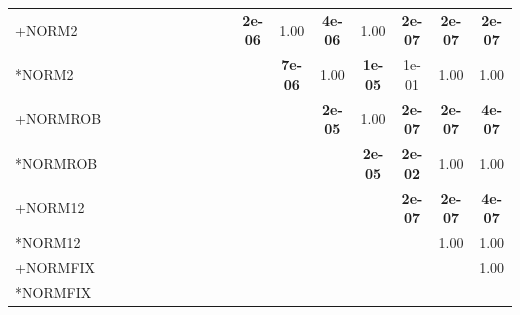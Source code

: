\begin{table}[t]
{\begin{tabular}{lcccccccccccccccc}
+NORM2 &  &  &  &  &  &  &  &  &  & \textbf{2e-06} & 1.00 & \textbf{4e-06} & 1.00 & \textbf{2e-07} & \textbf{2e-07} & \textbf{2e-07} \\
*NORM2 &  &  &  &  &  &  &  &  &  &  & \textbf{7e-06} & 1.00 & \textbf{1e-05} & 1e-01 & 1.00 & 1.00 \\
+NORMROB &  &  &  &  &  &  &  &  &  &  &  & \textbf{2e-05} & 1.00 & \textbf{2e-07} & \textbf{2e-07} & \textbf{4e-07} \\
*NORMROB &  &  &  &  &  &  &  &  &  &  &  &  & \textbf{2e-05} & \textbf{2e-02} & 1.00 & 1.00 \\
+NORM12 &  &  &  &  &  &  &  &  &  &  &  &  &  & \textbf{2e-07} & \textbf{2e-07} & \textbf{4e-07} \\
*NORM12 &  &  &  &  &  &  &  &  &  &  &  &  &  &  & 1.00 & 1.00 \\
+NORMFIX &  &  &  &  &  &  &  &  &  &  &  &  &  &  &  & 1.00 \\
*NORMFIX &  &  &  &  &  &  &  &  &  &  &  &  &  &  &  &  \\
\bottomrule
\end{tabular}
}
\end{table}

